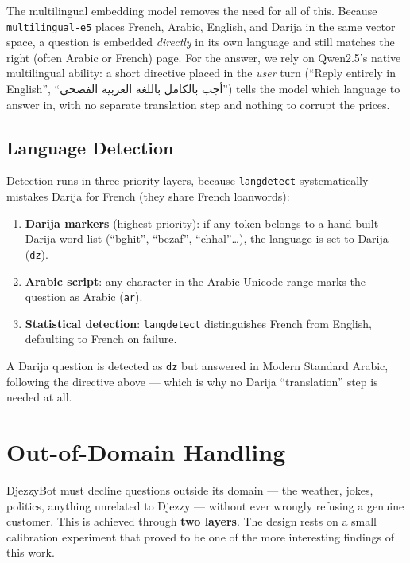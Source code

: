 \documentclass[12pt, a4paper]{report}
\newcommand{\humantext}[1]{#1}      %
\begin{document}
\humantext{The multilingual embedding model removes the need for all of this. Because \texttt{multilingual-e5} places French, Arabic, English, and Darija in the same vector space, a question is embedded \emph{directly} in its own language and still matches the right (often Arabic or French) page. For the answer, we rely on Qwen2.5's native multilingual ability: a short directive placed in the \emph{user} turn (``Reply entirely in English'', ``\textarabic{أجب بالكامل باللغة العربية الفصحى}'') tells the model which language to answer in, with no separate translation step and nothing to corrupt the prices.}

\subsection{Language Detection}
\humantext{Detection runs in three priority layers, because \texttt{langdetect} systematically mistakes Darija for French (they share French loanwords):}
\begin{enumerate}[noitemsep]
    \item \humantext{\textbf{Darija markers} (highest priority): if any token belongs to a hand-built Darija word list (``bghit'', ``bezaf'', ``chhal''\ldots), the language is set to Darija (\texttt{dz}).}
    \item \humantext{\textbf{Arabic script}: any character in the Arabic Unicode range marks the question as Arabic (\texttt{ar}).}
    \item \humantext{\textbf{Statistical detection}: \texttt{langdetect} distinguishes French from English, defaulting to French on failure.}
\end{enumerate}
\humantext{A Darija question is detected as \texttt{dz} but answered in Modern Standard Arabic, following the directive above --- which is why no Darija ``translation'' step is needed at all.}

\section{Out-of-Domain Handling}
\label{sec:ood}

\humantext{DjezzyBot must decline questions outside its domain --- the weather, jokes, politics, anything unrelated to Djezzy --- without ever wrongly refusing a genuine customer. This is achieved through \textbf{two layers}. The design rests on a small calibration experiment that proved to be one of the more interesting findings of this work.}
\end{document}
